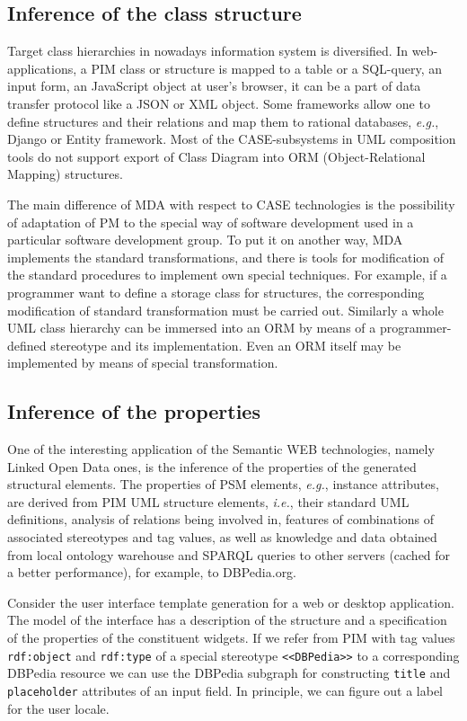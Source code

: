 \documentclass[conference,a4paper]{IEEEtran}
\begin{document}
\subsection{Inference of the class structure}
\label{sec:infstru}

Target class hierarchies in nowadays information system is diversified.  In web-applications, a PIM class or structure is mapped to a table or a SQL-query, an input form, an JavaScript object at user's browser, it can be a part of data transfer protocol like a JSON or XML object.  Some frameworks allow one to define structures and their relations and map them to rational databases, \emph{e.g.}, Django \cite{stratego} or Entity framework.  Most of the CASE-subsystems in UML composition tools do not support export of Class Diagram into ORM (Object-Relational Mapping) structures.

The main difference of MDA with respect to CASE technologies is the possibility of adaptation of PM to the special way of software development used in a particular software development group.  To put it on another way, MDA implements the standard transformations, and there is tools for modification of the standard procedures to implement own special techniques.  For example, if a programmer want to define a storage class for structures, the corresponding modification of standard transformation must be carried out.  Similarly a whole UML class hierarchy can be immersed into an ORM by means of a programmer-defined stereotype and its implementation.  Even an ORM itself may be implemented by means of special transformation.

\subsection{Inference of the properties}
\label{sec:infprop}

One of the interesting application of the Semantic WEB technologies, namely Linked Open Data ones, is the inference of the properties of the generated structural elements.  The properties of PSM elements, \emph{e.g.}, instance attributes, are derived from PIM UML structure elements, \emph{i.e.}, their standard UML definitions, analysis of relations being involved in, features of combinations of associated stereotypes and tag values, as well as knowledge and data obtained from local ontology warehouse and SPARQL queries to other servers (cached for a better performance), for example, to DBPedia.org.

Consider the user interface template generation for a web or desktop application.  The model of the interface has a description of the structure and a specification of the properties of the constituent widgets.  If we refer from PIM with tag values \texttt{rdf:object} and \texttt{rdf:type} of a special stereotype \texttt{<<DBPedia>>} to a corresponding DBPedia resource we can use the DBPedia subgraph for constructing \texttt{title} and \texttt{placeholder} attributes of an input field.  In principle, we can figure out a label for the user locale.
\end{document}
